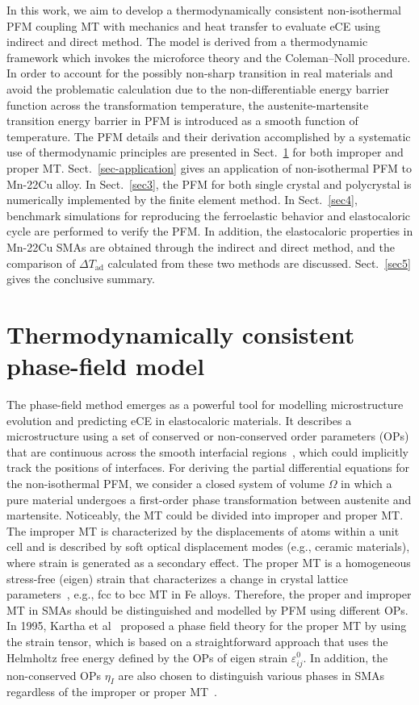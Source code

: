 \documentclass[reprint,3p,sort&compress,times,onecolumn]{elsarticle}
\begin{document}
In this work, we aim to develop a thermodynamically consistent non-isothermal PFM coupling MT with mechanics and heat transfer to evaluate eCE using indirect and direct method. The model is derived from a thermodynamic framework which invokes the microforce theory and the Coleman--Noll procedure. In order to account for the possibly non-sharp transition in real materials and avoid the problematic calculation due to the non-differentiable energy barrier function across the transformation temperature, the austenite-martensite transition energy barrier in PFM is introduced as a smooth function of temperature. The PFM details and their derivation accomplished by a systematic use of thermodynamic principles are presented in Sect.~\ref{sec2} for both improper and proper MT.
Sect.~\ref{sec-application} gives an application of non-isothermal PFM to Mn-22Cu alloy.
In Sect.~\ref{sec3}, the PFM for both single crystal and polycrystal is numerically implemented by the finite element method. 
In Sect.~\ref{sec4}, benchmark simulations for reproducing the ferroelastic behavior and elastocaloric cycle are performed to verify the PFM.  
In addition, the elastocaloric properties in Mn-22Cu SMAs are obtained through the indirect and direct method, and the comparison of $\Delta T_{\text{ad}}$ calculated from these two methods are discussed. 
Sect.~\ref{sec5} gives the conclusive summary.




\section{Thermodynamically consistent phase-field model}\label{sec2}
The phase-field method emerges as a powerful tool for modelling  microstructure evolution and predicting eCE in elastocaloric materials. It describes a microstructure using a set of conserved or non-conserved order parameters (OPs) that are continuous across the smooth interfacial regions~\cite{anderson1998diffuse}, which could implicitly track the positions of interfaces. For deriving the partial differential equations for the non-isothermal PFM, we consider a closed system of volume $\Omega$ in which a pure material undergoes a first-order phase transformation between austenite and martensite. Noticeably, the MT could be divided into improper and proper MT.
The improper MT is characterized by the displacements of atoms within a unit cell and is described by soft optical displacement modes (e.g., ceramic materials), where strain is generated as a secondary effect. The proper MT is a homogeneous stress-free (eigen) strain that characterizes a change in crystal lattice parameters~\cite{Khachaturyan1997Three,artemev2001three}, e.g., fcc to bcc MT in Fe alloys. Therefore, the proper and improper MT in SMAs should be distinguished and modelled by PFM using different OPs. 
In 1995, Kartha et al~\cite{Kartha1995Disorder} proposed a phase field theory for the proper MT by using the strain tensor, which is based on a straightforward approach that uses the Helmholtz free energy defined by the OPs of eigen strain $\varepsilon_{ij}^0$. In addition, the non-conserved OPs $\eta_I$ are also chosen to distinguish various phases in SMAs regardless of the improper or proper MT~\cite{cui2017three}.
\end{document}
